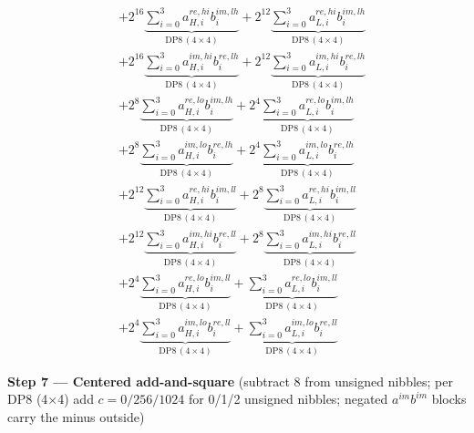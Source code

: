 \documentclass[fleqn]{article}
\newcommand{\DPop}[3]{\mathrm{DP#1}\,(#2\!\times\!#3)}
\begin{document}
\begin{align*}
  & + 2^{16}\underbrace{\sum_{i=0}^{3} a_{H,i}^{re,hi} b_i^{im,lh}}_{\DPop{8}{4}{4}} + 2^{12}\underbrace{\sum_{i=0}^{3} a_{L,i}^{re,hi} b_i^{im,lh}}_{\DPop{8}{4}{4}} \\[0.4em]
  & + 2^{16}\underbrace{\sum_{i=0}^{3} a_{H,i}^{im,hi} b_i^{re,lh}}_{\DPop{8}{4}{4}} + 2^{12}\underbrace{\sum_{i=0}^{3} a_{L,i}^{im,hi} b_i^{re,lh}}_{\DPop{8}{4}{4}} \\[0.4em]
  & + 2^{8}\underbrace{\sum_{i=0}^{3} a_{H,i}^{re,lo} b_i^{im,lh}}_{\DPop{8}{4}{4}} + 2^{4}\underbrace{\sum_{i=0}^{3} a_{L,i}^{re,lo} b_i^{im,lh}}_{\DPop{8}{4}{4}} \\[0.4em]
  & + 2^{8}\underbrace{\sum_{i=0}^{3} a_{H,i}^{im,lo} b_i^{re,lh}}_{\DPop{8}{4}{4}} + 2^{4}\underbrace{\sum_{i=0}^{3} a_{L,i}^{im,lo} b_i^{re,lh}}_{\DPop{8}{4}{4}} \\[0.4em]
  & + 2^{12}\underbrace{\sum_{i=0}^{3} a_{H,i}^{re,hi} b_i^{im,ll}}_{\DPop{8}{4}{4}} + 2^{8}\underbrace{\sum_{i=0}^{3} a_{L,i}^{re,hi} b_i^{im,ll}}_{\DPop{8}{4}{4}} \\[0.4em]
  & + 2^{12}\underbrace{\sum_{i=0}^{3} a_{H,i}^{im,hi} b_i^{re,ll}}_{\DPop{8}{4}{4}} + 2^{8}\underbrace{\sum_{i=0}^{3} a_{L,i}^{im,hi} b_i^{re,ll}}_{\DPop{8}{4}{4}} \\[0.4em]
  & + 2^{4}\underbrace{\sum_{i=0}^{3} a_{H,i}^{re,lo} b_i^{im,ll}}_{\DPop{8}{4}{4}} + \underbrace{\sum_{i=0}^{3} a_{L,i}^{re,lo} b_i^{im,ll}}_{\DPop{8}{4}{4}} \\[0.4em]
  & + 2^{4}\underbrace{\sum_{i=0}^{3} a_{H,i}^{im,lo} b_i^{re,ll}}_{\DPop{8}{4}{4}} + \underbrace{\sum_{i=0}^{3} a_{L,i}^{im,lo} b_i^{re,ll}}_{\DPop{8}{4}{4}}
\end{align*}


\textbf{Step 7 --- Centered add-and-square}\quad
{\small(subtract $8$ from unsigned nibbles; per DP8 (4$\times$4) add $c=0/256/1024$ for 0/1/2 unsigned nibbles; negated $a^{im}b^{im}$ blocks carry the minus outside)}
\end{document}
